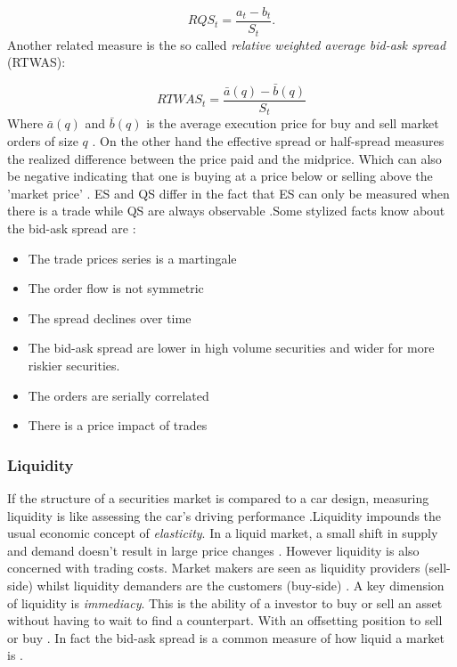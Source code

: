 \documentclass{kththesis}
\theoremstyle{definition}
\begin{document}
\begin{equation*}
    RQS_t = \frac{a_t - b_t}{S_t}.
\end{equation*}
Another related measure is the so called \textit{relative weighted average bid-ask spread} (RTWAS):

\begin{equation}
\label{eq:4}
    RTWAS_{t} = \frac{\bar{a}(q) - \bar{b}(q)}{S_t}
\end{equation}
Where $\bar{a}(q)$ and $\bar{b}(q)$ is the average execution price for buy and sell market orders of size $q$ \parencite{foucault2013market}. On the other hand the effective spread or half-spread measures the realized difference between the price paid and the midprice. Which can also be negative indicating that one is buying at a price below or selling above the 'market price' \parencite{cartea2015algorithmic}. ES and QS differ in the fact that ES can only be measured when there is a trade while QS are always observable \parencite{cartea2015algorithmic}.Some stylized facts know about the bid-ask spread are \parencite{hasbrouck2007empirical, madhavan2002market}:
\begin{itemize}
    \item The trade prices series is a martingale
    \item The order flow is not symmetric
    \item The spread declines over time
    \item The bid-ask spread are lower in high volume securities and wider for more riskier securities.
    \item The orders are serially correlated
    \item There is a price impact of trades
\end{itemize}

\subsubsection*{Liquidity}
If the structure of a securities market is compared to a car design, measuring liquidity is like assessing the car's driving performance \parencite{foucault2013market}.Liquidity impounds the usual economic concept of \textit{elasticity}. In a liquid market, a small shift in supply and demand doesn't result in large price changes \parencite{hasbrouck2007empirical}. However liquidity is also concerned with trading costs. Market makers are seen as liquidity providers (sell-side) whilst liquidity demanders are the customers (buy-side) \parencite{hasbrouck2007empirical}. A key dimension of liquidity is \textit{immediacy}. This is the ability of a investor to buy or sell an asset without having to wait to find a counterpart. With an offsetting position to sell or buy \parencite{cartea2015algorithmic}. In fact the bid-ask spread is a common measure of how liquid a market is \parencite{foucault2013market}.
\end{document}

